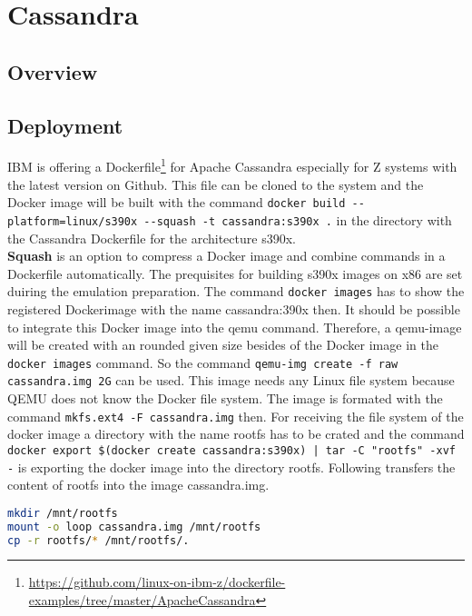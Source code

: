 \chapter{Cassandra}\label{ch:cassandra}

\section{Overview}

\section{Deployment}\label{Cassandra-Deployment}

IBM is offering a Dockerfile\footnote{\url{https://github.com/linux-on-ibm-z/dockerfile-examples/tree/master/ApacheCassandra}} for Apache Cassandra especially for Z systems with the latest version on Github. This file can be cloned to the system and the Docker image will be built with the command  \lstinline!docker build --platform=linux/s390x --squash -t cassandra:s390x .! in the directory with the Cassandra Dockerfile  for the architecture s390x. \\
\textbf{Squash} is an option to compress a Docker image and combine commands in a Dockerfile automatically. The prequisites for building s390x images on x86 are set duiring the emulation preparation. The command \lstinline!docker images! has to show the registered Dockerimage with the name cassandra:390x then. It should be possible to integrate this Docker image into the qemu command. Therefore, a qemu-image will be created with an rounded given size besides of the Docker image in the  \lstinline!docker images! command. So the command  \lstinline!qemu-img create -f raw cassandra.img 2G! can be used. This image needs any Linux file system because QEMU does not know the Docker file system. The image is formated with the command  \lstinline!mkfs.ext4 -F cassandra.img! then. For receiving the file system of the docker image a directory with the name rootfs has to be crated and the command
\lstinline!docker export $(docker create cassandra:s390x) | tar -C "rootfs" -xvf -! is exporting the docker image into the directory rootfs. Following transfers the content of rootfs into the image cassandra.img.

\begin{lstlisting}[language=bash,caption={Mount rootfs},captionpos=b]
mkdir /mnt/rootfs
mount -o loop cassandra.img /mnt/rootfs
cp -r rootfs/* /mnt/rootfs/.
 \end{lstlisting}


